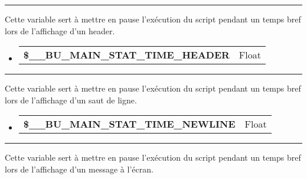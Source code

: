\documentclass[a4paper,10pt]{article}
\begin{document}

\par\noindent\rule{\textwidth}{0.4pt}

\begin{justify}
    Cette variable sert à mettre en pause l'exécution du script pendant un temps bref lors de l'affichage d'un header.
\end{justify}

\begin{justify}
     \begin{itemize}
        \item
        {
            \begin{tabular}{l|l}
                \textbf{\color{orange}\$\_\_BU\_MAIN\_STAT\_TIME\_HEADER}   & Float\\[1\baselineskip]
            \end{tabular}
        }
    \end{itemize}
\end{justify}


\par\noindent\rule{\textwidth}{0.4pt}

\begin{justify}
    Cette variable sert à mettre en pause l'exécution du script pendant un temps bref lors de l'affichage d'un saut de ligne.
\end{justify}

\begin{justify}
     \begin{itemize}
        \item
        {
            \begin{tabular}{l|l}
                \textbf{\color{orange}\$\_\_BU\_MAIN\_STAT\_TIME\_NEWLINE}  & Float\\[1\baselineskip]
            \end{tabular}
        }
    \end{itemize}
\end{justify}


\par\noindent\rule{\textwidth}{0.4pt}

\begin{justify}
    Cette variable sert à mettre en pause l'exécution du script pendant un temps bref lors de l'affichage d'un message à l'écran.
\end{justify}
\end{document}

